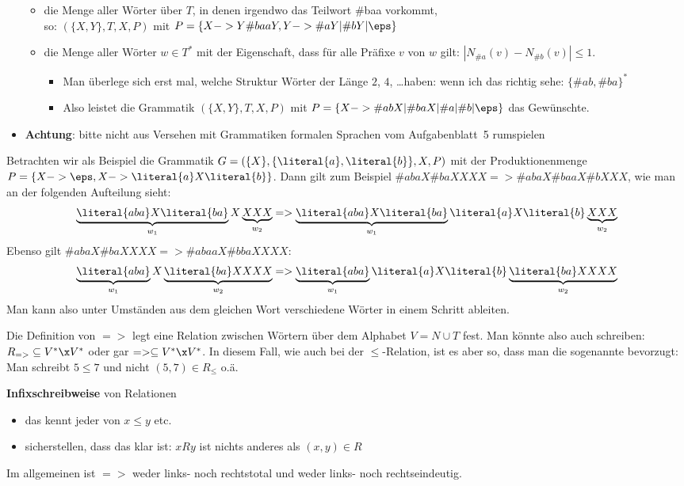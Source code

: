 \begin{tutorium}
\begin{itemize}
\begin{itemize}
    \item die Menge aller Wörter über $T$, in denen irgendwo das
      Teilwort \#{baa} vorkommt, \\
      \zB so: $(\{X,Y\},T,X,P)$ mit $P=\{X->Y\#{baa}Y, Y ->\#aY|
      \#bY|\eps\}$
    \item die Menge aller Wörter $w\in T^*$ mit der Eigenschaft, dass
      für alle Präfixe $v$ von $w$ gilt: $|N_{\#a}(v) -N_{\#b}(v)| \leq
      1$. 
      \begin{itemize}
      \item Man überlege sich erst mal, welche Struktur Wörter der Länge
        $2$, $4$, \dots haben: wenn ich das richtig sehe: $\{\#{ab},
        \#{ba}\}^*$
      \item Also leistet die Grammatik $(\{X,Y\},T,X,P)$ mit
        $P=\{X->\#{ab}X|\#{ba}X|\#a|\#b|\eps\}$ das Gewünschte.
      \end{itemize}
    \end{itemize}
  \item \textbf{Achtung}: bitte nicht aus Versehen mit Grammatiken \bzw
    formalen Sprachen vom Aufgabenblatt~5 rumspielen
  \end{itemize}
\end{tutorium}

Betrachten wir als Beispiel die Grammatik $G=(\{X\},\{\literal{a},
\literal{b}\}, X, P)$ mit der Produktionenmenge $P=\{X-> \eps,
X->\literal{a} X\literal{b} \}$. Dann gilt zum Beispiel
$\#{aba}X\#{ba}XXXX => \#{aba}X\#{baa}X\#bXXX$, wie man an der
folgenden Aufteilung sieht:
\[
\underbrace{\literal{aba}X\literal{ba}}_{w_1}X\underbrace{XXX}_{w_2} 
=> \underbrace{\literal{aba}X\literal{ba}}_{w_1}\literal{a}X\literal{b}\underbrace{XXX}_{w_2} 
\]
Ebenso gilt $\#{aba}X\#{ba}XXXX => \#{abaa}X\#{bba}XXXX$:
\[
\underbrace{\literal{aba}}_{w_1}X\underbrace{\literal{ba}XXXX}_{w_2} 
=> \underbrace{\literal{aba}}_{w_1}\literal{a}X\literal{b}\underbrace{\literal{ba}XXXX}_{w_2} 
\]
Man kann also unter Umständen aus dem gleichen Wort verschiedene
Wörter in einem Schritt ableiten.

Die Definition von $=>$ legt eine Relation zwischen Wörtern über dem
Alphabet $V=N\cup T$ fest. Man könnte also auch schreiben: $R_{=>}
\subseteq V^*\x V^*$ oder gar $=> \subseteq V^*\x V^*$.  In diesem
Fall, wie \zB auch bei der $\leq$-Relation, ist es aber so, dass man
die sogenannte 
bevorzugt: Man schreibt $5 \leq 7$ und nicht $(5,7)\in R_{\leq}$
o.\;ä.
%
\begin{tutorium}
  \noindent
  \textbf{Infixschreibweise} von Relationen
  \begin{itemize}
  \item das kennt jeder von $x \leq y$ etc.
  \item sicherstellen, dass das klar ist: $x R y$ ist nichts anderes als $(x,y)\in R$
  \end{itemize}
\end{tutorium}
Im allgemeinen ist $=>$ weder links- noch rechtstotal und weder links-
noch rechtseindeutig.

